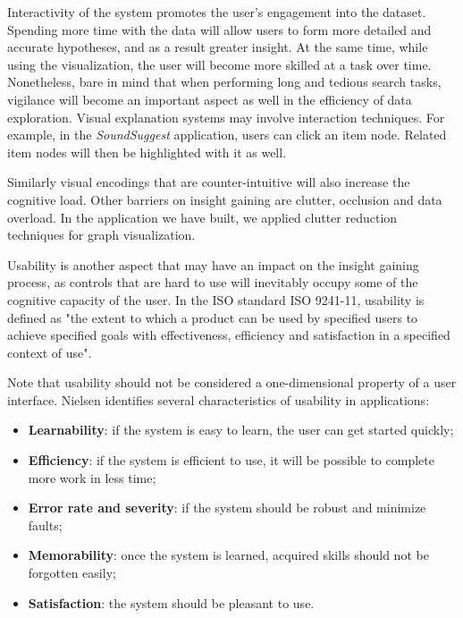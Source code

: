 Interactivity of the system promotes the user's engagement into the dataset. Spending more time with the data will allow users to form more detailed and accurate hypotheses, and as a result greater insight\cite{yi:2008}. At the same time, while using the visualization, the user will become more skilled at a task over time. Nonetheless, bare in mind that when performing long and tedious search tasks, vigilance will become an important aspect as well in the efficiency of data exploration\cite{ware:2004}. Visual explanation systems may involve interaction techniques. For example, in the \emph{SoundSuggest} application, users can click an item node. Related item nodes will then be highlighted with it as well.

Similarly visual encodings that are counter-intuitive will also increase the cognitive load. Other barriers on insight gaining are clutter, occlusion and data overload\cite{yi:2008}. In the application we have built, we applied clutter reduction techniques for graph visualization.

Usability is another aspect that may have an impact on the insight gaining process, as controls that are hard to use will inevitably occupy some of the cognitive capacity of the user\cite{yi:2008}. In the ISO standard ISO 9241-11, usability is defined as "the extent to which a product can be used by specified users to achieve specified goals with effectiveness, efficiency and satisfaction in a specified context of use"\cite{usabilitynet:2006:standards}.

Note that usability should not be considered a one-dimensional property of a user interface. Nielsen identifies several characteristics of usability in applications\cite{nielsen:1993:UE:529793}:

\begin{itemize}
	\item \textbf{Learnability}: if the system is easy to learn, the user can get started quickly;
	\item \textbf{Efficiency}: if the system is efficient to use, it will be possible to complete more work in less time;
	\item \textbf{Error rate and severity}: if the system should be robust and minimize faults;
	\item \textbf{Memorability}: once the system is learned, acquired skills should not be forgotten easily;
	\item \textbf{Satisfaction}: the system should be pleasant to use.
\end{itemize}

